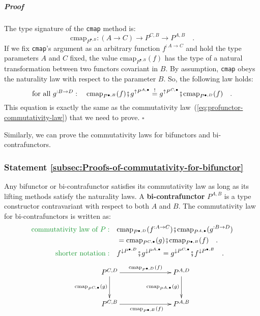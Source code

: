 \subparagraph{Proof}

The type signature of the \lstinline!cmap! method is:
\[
\text{cmap}_{P^{\bullet,B}}:(A\rightarrow C)\rightarrow P^{C,B}\rightarrow P^{A,B}\quad.
\]
If we fix \lstinline!cmap!\textsf{'}s argument as an arbitrary function $f^{:A\rightarrow C}$
and hold the type parameters $A$ and $C$ fixed, the value $\text{cmap}_{P^{\bullet,B}}(f)$
has the type of a natural transformation between two functors covariant
in $B$. By assumption, \lstinline!cmap! obeys the naturality law
with respect to the parameter $B$. So, the following law holds:
\[
\text{for all }g^{:B\rightarrow D}:\quad\text{cmap}_{P^{\bullet,B}}(f)\bef g^{\uparrow P^{A,\bullet}}\overset{!}{=}g^{\uparrow P^{C,\bullet}}\bef\text{cmap}_{P^{\bullet,D}}(f)\quad.
\]
This equation is exactly the same as the commutativity law~(\ref{eq:profunctor-commutativity-law})
that we need to prove. $\square$

Similarly, we can prove the commutativity laws for bifunctors and
bi-contrafunctors.

\subsubsection{Statement \label{subsec:Proofs-of-commutativity-for-bifunctor}\ref{subsec:Proofs-of-commutativity-for-bifunctor}}

Any bifunctor or bi-contrafunctor satisfies its commutativity law
as long as its lifting methods satisfy the naturality laws. A \textbf{bi-contrafunctor}
$P^{A,B}$ is a type constructor contravariant with respect to both
$A$ and $B$. The commutativity law for bi-contrafunctors is written
as:
\begin{align}
{\color{greenunder}\text{commutativity law of }P:}\quad & \text{cmap}_{P^{\bullet,D}}(f^{:A\rightarrow C})\bef\text{cmap}_{P^{A,\bullet}}(g^{:B\rightarrow D})\nonumber \\
 & =\text{cmap}_{P^{C,\bullet}}(g)\bef\text{cmap}_{P^{\bullet,B}}(f)\quad.\nonumber \\
{\color{greenunder}\text{shorter notation}:}\quad & f^{\downarrow P^{\bullet,D}}\bef g^{\downarrow P^{A,\bullet}}=g^{\downarrow P^{C,\bullet}}\bef f^{\downarrow P^{\bullet,B}}\quad.\label{eq:bi-contrafunctor-commutativity-law}
\end{align}
\[
\xymatrix{\xyScaleY{2.5pc}\xyScaleX{6.0pc}P^{C,D}\ar[r]\sp(0.55){\text{cmap}_{P^{\bullet,D}}(f)~~~}\ar[d]\sb(0.45){\text{cmap}_{P^{C,\bullet}}(g)} & P^{A,D}\ar[d]\sb(0.45){\text{cmap}_{P^{A,\bullet}}(g)}\\
P^{C,B}\ar[r]\sb(0.45){~~~~\text{cmap}_{P^{\bullet,B}}(f)} & P^{A,B}
}
\]


